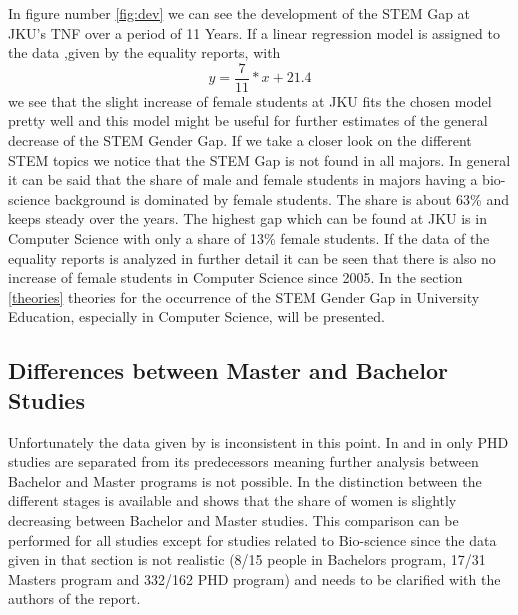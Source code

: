 \documentclass[12pt]{article}
\begin{document}
In figure number \ref{fig:dev} we can see the development of the STEM Gap at JKU's TNF over a period of 11 Years. If   a linear regression model is assigned to the data ,given by the equality reports, with 
\begin{equation}
y= \frac{7}{11}*x+21.4
\end{equation}  we see that the slight increase of female students at JKU fits the chosen model pretty well and this model might be useful for further estimates of the general decrease of the STEM Gender Gap.
If we take a closer look on the different STEM topics we notice that the STEM Gap is not found in all majors. In general it can be said that the share of male and female students in majors having a bio-science background   is dominated by female students. The share is about 63\% and keeps steady over the years. 
The highest gap which can be found at JKU is in Computer Science with only a share of 13\% female students. If the data of the equality reports is analyzed in further detail it can be seen that there is also no increase of female students in Computer Science since 2005. In the section \ref{theories} theories for the occurrence of the STEM Gender Gap in University Education, especially in Computer Science, will be presented.
\subsection {Differences between Master and Bachelor Studies}
Unfortunately the data given by \cite{eq_1}\cite{eq_2}\cite{eq_3} is inconsistent in this point. In \cite{eq_1}and in \cite{eq_2} only PHD studies are separated from its predecessors meaning further analysis between Bachelor and Master programs is not possible. In \cite{eq_3} the distinction between the different stages is available and shows that the share of women is slightly decreasing between Bachelor and Master studies. This comparison can be performed for all studies except for studies related to Bio-science since the data given in that section is not realistic (8/15 people in Bachelors program, 17/31 Masters program and 332/162 PHD program) and needs to be clarified with the authors of the report. 
\end{document}
